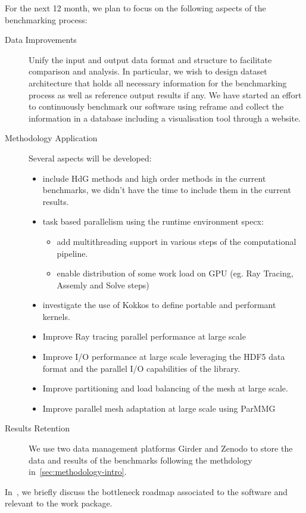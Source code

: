 For the next 12 month, we plan to focus on the following aspects of the benchmarking process:
\begin{description}
    \item[Data Improvements] Unify the input and output data format and structure to facilitate comparison and analysis. In particular, we wish to design dataset architecture that holds all necessary information for the benchmarking process as well as reference output results if any.  We have started an effort to continuously benchmark our software using reframe and collect the information in a database including a visualisation tool through a website.
    \item[Methodology Application] Several aspects will be developed:
    \begin{itemize}
        \item include HdG methods and high order methods in the current benchmarks, we didn't have the time to include them in the current results.
        \item task based parallelism using the runtime environment \ac{specx}:
        \begin{itemize}
            \item add multithreading support in various steps of the computational pipeline.
            \item enable distribution of some work load on GPU (eg. Ray Tracing, Assemly and Solve steps)
        \end{itemize}
        \item investigate the use of Kokkos to define portable and performant kernels.
        \item Improve Ray tracing parallel performance at large scale
        \item Improve I/O performance at large scale leveraging the HDF5 data format and the parallel I/O capabilities of the library.
        \item Improve partitioning and load balancing of the mesh at large scale.
        \item Improve parallel mesh adaptation at large scale using ParMMG
    \end{itemize}
    \item[Results Retention] We use two data management platforms Girder and Zenodo to store the data and results of the benchmarks following the methdology in~\cref{sec:methodology-intro}.
\end{description}

In~, we briefly discuss the bottleneck roadmap associated to the software and relevant to the work package.


